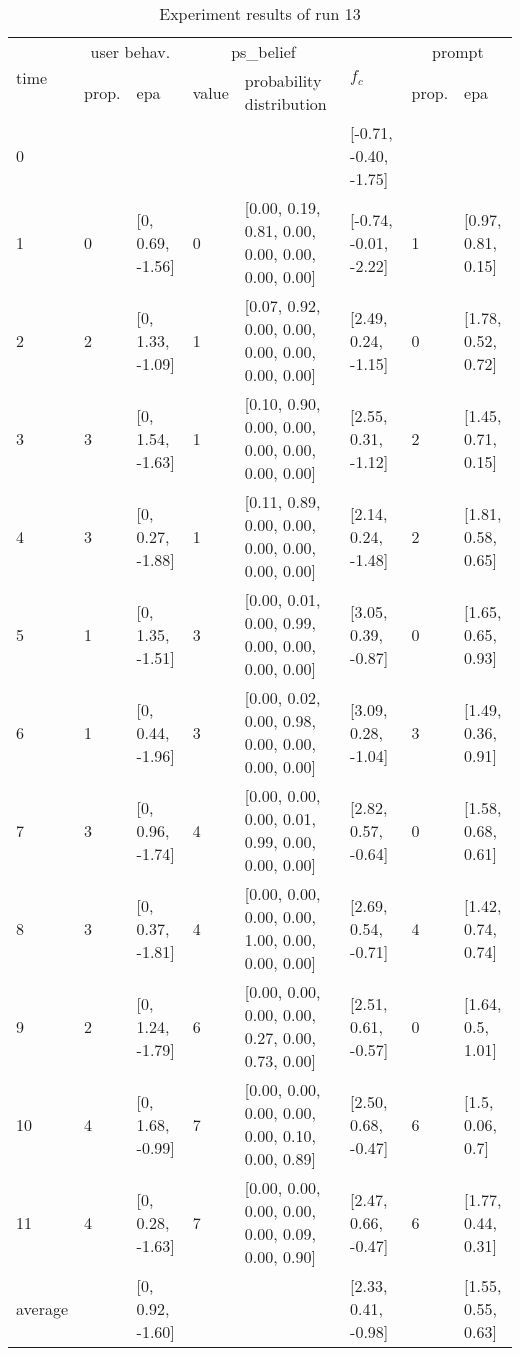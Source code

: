\begin{table}[htbp]\footnotesize
\caption{Experiment results of run 13}
\begin{tabular}{|p{0.4cm}|p{0.6cm}|l|p{0.6cm}|p{3.3cm}|l|p{0.6cm}|l|}
\hline

\multirow{2}{*}{time} & \multicolumn{2}{c|}{user behav.} & \multicolumn{2}{c|}{ps\_belief} &
\multirow{2}{*}{$f_c$} & \multicolumn{2}{c|}{prompt} \\ \cline{2-5}\cline{ 7- 8}
& prop. & epa & value & probability distribution &  & prop. & epa \\ \hline

0 & \multicolumn{1}{l|}{} &  & \multicolumn{1}{l|}{} &  & [-0.71, -0.40, -1.75] & \multicolumn{1}{l|}{} &  \\ \hline
1 & 0 & [0, 0.69, -1.56] & 0 & [0.00, 0.19, 0.81, 0.00, 0.00, 0.00, 0.00, 0.00] & [-0.74, -0.01, -2.22] & 1 & [0.97, 0.81, 0.15] \\ \hline
2 & 2 & [0, 1.33, -1.09] & 1 & [0.07, 0.92, 0.00, 0.00, 0.00, 0.00, 0.00, 0.00] & [2.49, 0.24, -1.15] & 0 & [1.78, 0.52, 0.72] \\ \hline
3 & 3 & [0, 1.54, -1.63] & 1 & [0.10, 0.90, 0.00, 0.00, 0.00, 0.00, 0.00, 0.00] & [2.55, 0.31, -1.12] & 2 & [1.45, 0.71, 0.15] \\ \hline
4 & 3 & [0, 0.27, -1.88] & 1 & [0.11, 0.89, 0.00, 0.00, 0.00, 0.00, 0.00, 0.00] & [2.14, 0.24, -1.48] & 2 & [1.81, 0.58, 0.65] \\ \hline
5 & 1 & [0, 1.35, -1.51] & 3 & [0.00, 0.01, 0.00, 0.99, 0.00, 0.00, 0.00, 0.00] & [3.05, 0.39, -0.87] & 0 & [1.65, 0.65, 0.93] \\ \hline
6 & 1 & [0, 0.44, -1.96] & 3 & [0.00, 0.02, 0.00, 0.98, 0.00, 0.00, 0.00, 0.00] & [3.09, 0.28, -1.04] & 3 & [1.49, 0.36, 0.91] \\ \hline
7 & 3 & [0, 0.96, -1.74] & 4 & [0.00, 0.00, 0.00, 0.01, 0.99, 0.00, 0.00, 0.00] & [2.82, 0.57, -0.64] & 0 & [1.58, 0.68, 0.61] \\ \hline
8 & 3 & [0, 0.37, -1.81] & 4 & [0.00, 0.00, 0.00, 0.00, 1.00, 0.00, 0.00, 0.00] & [2.69, 0.54, -0.71] & 4 & [1.42, 0.74, 0.74] \\ \hline
9 & 2 & [0, 1.24, -1.79] & 6 & [0.00, 0.00, 0.00, 0.00, 0.27, 0.00, 0.73, 0.00] & [2.51, 0.61, -0.57] & 0 & [1.64, 0.5, 1.01] \\ \hline
10 & 4 & [0, 1.68, -0.99] & 7 & [0.00, 0.00, 0.00, 0.00, 0.00, 0.10, 0.00, 0.89] & [2.50, 0.68, -0.47] & 6 & [1.5, 0.06, 0.7] \\ \hline
11 & 4 & [0, 0.28, -1.63] & 7 & [0.00, 0.00, 0.00, 0.00, 0.00, 0.09, 0.00, 0.90] & [2.47, 0.66, -0.47] & 6 & [1.77, 0.44, 0.31] \\ \hline
\multicolumn{1}{|l|}{average} & \multicolumn{1}{l|}{} & [0, 0.92, -1.60] & \multicolumn{1}{l|}{} &  & [2.33, 0.41, -0.98] & \multicolumn{1}{l|}{} & [1.55, 0.55, 0.63] \\ \hline
\end{tabular}
\label{}
\end{table}


